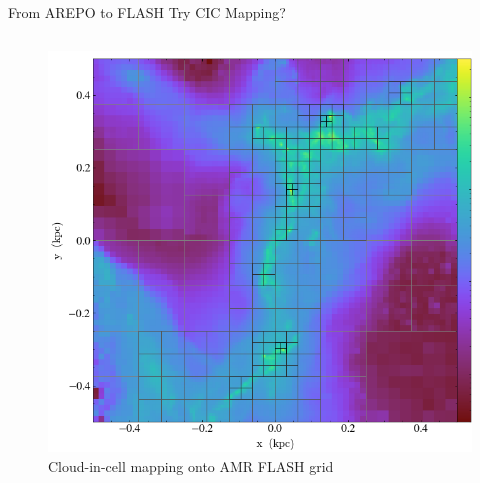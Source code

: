 \documentclass[aspectratio=169]{beamer}
\begin{document}
\begin{frame}{From AREPO to FLASH} {Try CIC Mapping?}
\begin{columns}
\begin{column}{0.35\textwidth}
\begin{figure}[h!]
                \includegraphics[width=\linewidth]{../images/cloud_in_cell_projection_lvl8.png} \\
                Cloud-in-cell mapping onto AMR FLASH grid
                \label{fig:amr_example}
            \end{figure}
        \end{column}
    \end{columns}
\end{frame} 
%
%
%
%
%
\end{document}
